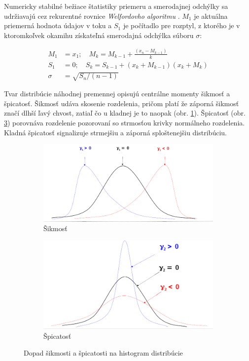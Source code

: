 Numericky stabilné bežiace štatistiky priemeru a smerodajnej odchýlky sa udržiavajú cez rekurentné rovnice
\emph{Welfordovho algoritmu} \cite{knuth}. $M_1$ je aktuálna priemerná hodnota údajov v toku a $S_1$ je počítadlo pre
rozptyl, z ktorého je v ktoromkoľvek okamihu získateľná smerodajná odchýlka súboru $\sigma$:
\begin{ceqn}\begin{align}
   M_1 &= x_1;\quad M_k = M_{k-1} + \frac{(x_n - M_{k-1})}{k} \\
   S_1 &= 0; \quad S_k = S_{k-1} + (x_k + M_{k-1})(x_k + M_k)  \\
   \sigma &= \sqrt{S_n / (n - 1)}
\end{align}\end{ceqn}

Tvar distribúcie náhodnej premennej opisujú centrálne momenty šikmosť a špicatosť. Šikmosť udáva skosenie
rozdelenia, pričom platí že záporná šikmosť značí dlhší ľavý chvost, zatiaľ čo u kladnej je to naopak (obr. \ref{fig:skewness}).
Špicatosť  (obr. \ref{fig:kurtosis}) porovnáva rozdelenie pozorovaní so strmosťou krivky normálneho rozdelenia. Kladná špicatosť
signalizuje strmejšiu a záporná sploštenejšiu distribúciu.
\begin{figure}[h]
\centering
\begin{subfigure}[b]{0.48\textwidth}
    \centering
    \includegraphics[width=\textwidth]{figures/analysis/skewness.png}
    \caption{Šikmosť}
    \label{fig:skewness}
\end{subfigure}
\hfill
\begin{subfigure}[b]{0.48\textwidth}
    \centering
    \includegraphics[width=\textwidth]{figures/analysis/kurtosis.png}
    \caption{Špicatosť}
    \label{fig:kurtosis}
\end{subfigure}
\caption{Dopad šikmosti a špicatosti na histogram distribúcie}
\end{figure}

